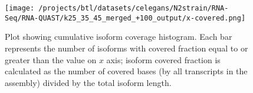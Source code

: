 \documentclass[12pt,a4paper]{article}
\begin{document}
\begin{figure}[t]
\centering
\texttt{[image: /projects/btl/datasets/celegans/N2strain/RNA-Seq/RNA-QUAST/k25\_35\_45\_merged\_+100\_output/x-covered.png]}
\caption{Plot showing cumulative isoform coverage histogram. Each bar represents the number of isoforms with covered fraction equal to or greater than the value on $x$ axis; isoform covered fraction is calculated as the number of covered bases (by all transcripts in the assembly) divided by the total isoform length.}
\end{figure}
\FloatBarrier
\clearpage
\end{document}
